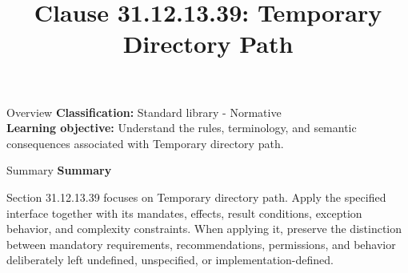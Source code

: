 \documentclass[10pt,letterpaper]{article}
\title{Clause 31.12.13.39: Temporary Directory Path}
\author{}
\date{}
\begin{document}
\maketitle
\begin{CornellOverviewBox}{Overview}
\textbf{Classification:} Standard library - Normative\\[2pt]
\textbf{Learning objective:} Understand the rules, terminology, and semantic consequences associated with Temporary directory path.
\end{CornellOverviewBox}\begin{CornellSummaryBox}{Summary}
{\sffamily\bfseries\color{Accent} Summary}\par\vspace{3pt}Section 31.12.13.39 focuses on Temporary directory path. Apply the specified interface together with its mandates, effects, result conditions, exception behavior, and complexity constraints. When applying it, preserve the distinction between mandatory requirements, recommendations, permissions, and behavior deliberately left undefined, unspecified, or implementation-defined.
\end{CornellSummaryBox}
\end{document}
